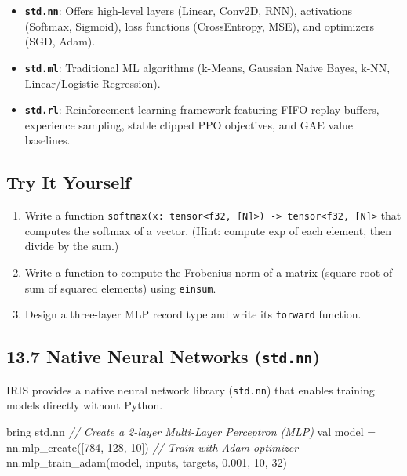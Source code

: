 \documentclass[
  english,
]{book}
\newenvironment{Shaded}{\begin{snugshade}}{\end{snugshade}}
\newcommand{\CommentTok}[1]{\textcolor[rgb]{0.42,0.60,0.33}{\textit{#1}}}
\newcommand{\DecValTok}[1]{\textcolor[rgb]{0.71,0.81,0.66}{#1}}
\newcommand{\NormalTok}[1]{\textcolor[rgb]{0.83,0.83,0.83}{#1}}
\newcommand{\OperatorTok}[1]{\textcolor[rgb]{0.83,0.83,0.83}{#1}}
\providecommand{\tightlist}{%
  \setlength{\itemsep}{0pt}\setlength{\parskip}{0pt}}
\begin{document}
\begin{itemize}
\tightlist
\item
  \textbf{\texttt{std.nn}}: Offers high-level layers (Linear, Conv2D,
  RNN), activations (Softmax, Sigmoid), loss functions (CrossEntropy,
  MSE), and optimizers (SGD, Adam).
\item
  \textbf{\texttt{std.ml}}: Traditional ML algorithms (k-Means, Gaussian
  Naive Bayes, k-NN, Linear/Logistic Regression).
\item
  \textbf{\texttt{std.rl}}: Reinforcement learning framework featuring
  FIFO replay buffers, experience sampling, stable clipped PPO
  objectives, and GAE value baselines.
\end{itemize}

\subsection{Try It Yourself}\label{try-it-yourself-12}

\begin{enumerate}
\def\labelenumi{\arabic{enumi}.}
\tightlist
\item
  Write a function
  \texttt{softmax(x:\ tensor\textless{}f32,\ {[}N{]}\textgreater{})\ -\textgreater{}\ tensor\textless{}f32,\ {[}N{]}\textgreater{}}
  that computes the softmax of a vector. (Hint: compute exp of each
  element, then divide by the sum.)
\item
  Write a function to compute the Frobenius norm of a matrix (square
  root of sum of squared elements) using \texttt{einsum}.
\item
  Design a three-layer MLP record type and write its \texttt{forward}
  function.
\end{enumerate}

\subsection{\texorpdfstring{13.7 Native Neural Networks
(\texttt{std.nn})}{13.7 Native Neural Networks (std.nn)}}\label{native-neural-networks-std.nn}

IRIS provides a native neural network library (\texttt{std.nn}) that
enables training models directly without Python.

\begin{Shaded}
\begin{Highlighting}[]
\NormalTok{bring std}\OperatorTok{.}\NormalTok{nn}
\CommentTok{// Create a 2{-}layer Multi{-}Layer Perceptron (MLP)}
\NormalTok{val model }\OperatorTok{=}\NormalTok{ nn}\OperatorTok{.}\NormalTok{mlp\_create([}\DecValTok{784}\OperatorTok{,} \DecValTok{128}\OperatorTok{,} \DecValTok{10}\NormalTok{])}
\CommentTok{// Train with Adam optimizer}
\NormalTok{nn}\OperatorTok{.}\NormalTok{mlp\_train\_adam(model}\OperatorTok{,}\NormalTok{ inputs}\OperatorTok{,}\NormalTok{ targets}\OperatorTok{,} \DecValTok{0.001}\OperatorTok{,} \DecValTok{10}\OperatorTok{,} \DecValTok{32}\NormalTok{)}
\end{Highlighting}
\end{Shaded}
\end{document}
